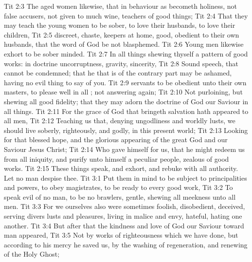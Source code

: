 \vs Tit 2:3 The aged women likewise, that  in behaviour as becometh holiness, not false accusers, not given to much wine, teachers of good things;
\vs Tit 2:4 That they may teach the young women to be sober, to love their husbands, to love their children,
\vs Tit 2:5  discreet, chaste, keepers at home, good, obedient to their own husbands, that the word of God be not blasphemed.
\vs Tit 2:6 Young men likewise exhort to be sober minded.
\vs Tit 2:7 In all things shewing thyself a pattern of good works: in doctrine  uncorruptness, gravity, sincerity,
\vs Tit 2:8 Sound speech, that cannot be condemned; that he that is of the contrary part may be ashamed, having no evil thing to say of you.
\vs Tit 2:9  servants to be obedient unto their own masters,  to please  well in all ; not answering again;
\vs Tit 2:10 Not purloining, but shewing all good fidelity; that they may adorn the doctrine of God our Saviour in all things.
\vs Tit 2:11 For the grace of God that bringeth salvation hath appeared to all men,
\vs Tit 2:12 Teaching us that, denying ungodliness and worldly lusts, we should live soberly, righteously, and godly, in this present world;
\vs Tit 2:13 Looking for that blessed hope, and the glorious appearing of the great God and our Saviour Jesus Christ;
\vs Tit 2:14 Who gave himself for us, that he might redeem us from all iniquity, and purify unto himself a peculiar people, zealous of good works.
\vs Tit 2:15 These things speak, and exhort, and rebuke with all authority. Let no man despise thee.
\vs Tit 3:1 Put them in mind to be subject to principalities and powers, to obey magistrates, to be ready to every good work,
\vs Tit 3:2 To speak evil of no man, to be no brawlers,  gentle, shewing all meekness unto all men.
\vs Tit 3:3 For we ourselves also were sometimes foolish, disobedient, deceived, serving divers lusts and pleasures, living in malice and envy, hateful,  hating one another.
\vs Tit 3:4 But after that the kindness and love of God our Saviour toward man appeared,
\vs Tit 3:5 Not by works of righteousness which we have done, but according to his mercy he saved us, by the washing of regeneration, and renewing of the Holy Ghost;
